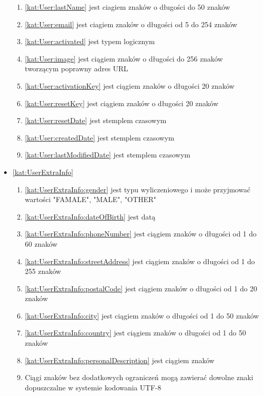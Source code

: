 \begin{itemize}[label={\textbf{Ograniczenia dla}}, wide, labelwidth=!, labelindent=0pt]
\begin{enumerate}[label={\textbf{OGR/\protect\threedigits{\arabic{enumi}}}}, wide, labelwidth=!, align=left, leftmargin=3cm, resume]
        \item \ref{kat:User:lastName} jest ciagiem znaków o długości do 50 znaków
        \item \ref{kat:User:email} jest ciagiem znaków o długości od 5 do 254 znaków
        \item \ref{kat:User:activated} jest typem logicznym
        \item \ref{kat:User:image} jest ciągiem znaków o długości do 256 znaków tworzącym poprawny adres URL
        \item \ref{kat:User:activationKey} jest ciągiem znaków o długości 20 znaków
        \item \ref{kat:User:resetKey} jest ciągiem znaków o długości 20 znaków
        \item \ref{kat:User:resetDate} jest stemplem czasowym
        \item \ref{kat:User:createdDate} jest stemplem czasowym
        \item \ref{kat:User:lastModifiedDate} jest stemplem czasowym
    \end{enumerate}
    \item\ref{kat:UserExtraInfo}
    \begin{enumerate}[label={\textbf{OGR/\protect\threedigits{\arabic{enumi}}}}, wide, labelwidth=!, align=left, leftmargin=3cm, resume]
        \item \ref{kat:UserExtraInfo:gender} jest typu wyliczeniowego i może przyjmować wartości "FAMALE", "MALE", "OTHER"
        \item \ref{kat:UserExtraInfo:dateOfBirth} jest datą
        \item \ref{kat:UserExtraInfo:phoneNumber} jest ciągiem znaków o długości od 1 do 60 znaków
        \item \ref{kat:UserExtraInfo:streetAddress} jest ciągiem znaków o długości od 1 do 255 znaków
        \item \ref{kat:UserExtraInfo:postalCode} jest ciągiem znaków o długości od 1 do 20 znaków
        \item \ref{kat:UserExtraInfo:city} jest ciągiem znaków o długości od 1 do 50 znaków
        \item \ref{kat:UserExtraInfo:country} jest ciągiem znaków o długości od 1 do 50 znaków
        \item \ref{kat:UserExtraInfo:personalDescription} jest ciągiem znaków
        \item Ciągi znaków bez dodatkowych ograniczeń mogą zawierać dowolne znaki dopuszczalne w systemie kodowania UTF-8
    \end{enumerate}

\end{itemize}
